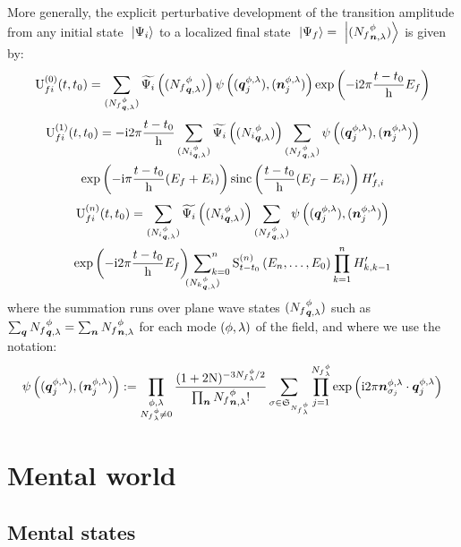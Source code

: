 \documentclass[10pt,a4paper,twoside,openany]{book}
\begin{document}
More generally, the explicit perturbative development of the transition amplitude from any initial state $\ \left|{\Psi_i}\right\rangle$ to a localized final state $\ \left|{\Psi_f}\right\rangle = \ \left|{({N_f}^{\phi}_{{\boldsymbol{n}}, {\lambda}})}\right\rangle$ is given by:
\begin{equation*}
\mathrm U_{{f}{i}}^{({0})}({t},{t_0}) = \sum_{({N_f}^{\phi}_{{\boldsymbol{q}}, {\lambda}})} \widetilde{\Psi_i} \left( ({N_f}^{\phi}_{{\boldsymbol{q}}, {\lambda}}) \right) \psi \left( ( \boldsymbol{q}^{\phi, \lambda}_j ), ( \boldsymbol{n}^{\phi, \lambda}_j ) \right) \mathrm{exp} \left( {-\mathrm{i} 2 \pi \frac{t - t_0} {\mathrm h} E_f} \right)
\end{equation*}
\begin{multline*}
\mathrm U_{{f}{i}}^{({1})}({t},{t_0}) = -\mathrm{i} 2 \pi \frac{t - t_0} {\mathrm h} \sum_{({N_i}^{\phi}_{{\boldsymbol{q}}, {\lambda}})} \widetilde{\Psi_i} \left( ({N_i}^{\phi}_{{\boldsymbol{q}}, {\lambda}}) \right) \sum_{({N_f}^{\phi}_{{\boldsymbol{q}}, {\lambda}})} \psi \left( ( \boldsymbol{q}^{\phi, \lambda}_j ), ( \boldsymbol{n}^{\phi, \lambda}_j ) \right) \\
\mathrm{exp} \left( {-\mathrm{i} \pi \frac{t - t_0} {\mathrm h} ( E_f + E_i )} \right) \mathrm{sinc} \left( {\frac{t - t_0} {\mathrm h} ( E_f - E_i )} \right) H'_{f,i}
\end{multline*}
\begin{multline*}
\mathrm U_{{f}{i}}^{({n})}({t},{t_0}) = \sum_{({N_i}^{\phi}_{{\boldsymbol{q}}, {\lambda}})} \widetilde{\Psi_i} \left( ({N_i}^{\phi}_{{\boldsymbol{q}}, {\lambda}}) \right) \sum_{({N_f}^{\phi}_{{\boldsymbol{q}}, {\lambda}})} \psi \left( ( \boldsymbol{q}^{\phi, \lambda}_j ), ( \boldsymbol{n}^{\phi, \lambda}_j ) \right) \\
\mathrm{exp} \left( {-\mathrm{i} 2 \pi \frac{t - t_0} {\mathrm h} E_f} \right) \sideset{}{_{k=0}^n}\sum_{({N_k}^{\phi}_{{\boldsymbol{q}}, {\lambda}})} \mathrm S^{(n)}_{t - t_0}\left({E_n, \dotsc, E_0}\right) \prod_{k=1}^n H'_{k,k-1}
\end{multline*}
where the summation runs over plane wave states $({N_f}^{\phi}_{{\boldsymbol{q}}, {\lambda}})$ such as $\sum_{\boldsymbol{q}} {N_f}^{\phi}_{{\boldsymbol{q}}, {\lambda}} = \sum_{\boldsymbol{n}} {N_f}^{\phi}_{{\boldsymbol{n}}, {\lambda}}$ for each mode $( \phi, \lambda )$ of the field, and where we use the notation:
\begin{equation*}
\psi \left( ( \boldsymbol{q}^{\phi, \lambda}_j ), ( \boldsymbol{n}^{\phi, \lambda}_j ) \right) := \prod_{\substack{\phi, \lambda \\ {N_f}^\phi_\lambda \neq 0}} \frac{(1+2 \mathrm N)^{-3 {N_f}^\phi_\lambda / 2} }{\prod_{\boldsymbol{n}} {N_f}^{\phi}_{{\boldsymbol{n}}, {\lambda}} !} \sum_{\sigma \in \mathfrak{S}_{{N_f}^\phi_\lambda}} \prod_{j = 1}^{{N_f}^\phi_\lambda} \mathrm{exp} \left( {\mathrm{i} 2 \pi \boldsymbol{n}^{\phi, \lambda}_{\sigma_j} \cdot \boldsymbol{q}^{\phi, \lambda}_j} \right)
\end{equation*}

\part{Mental world}

\chapter{Mental states}
\label{Mental states}
\end{document}
